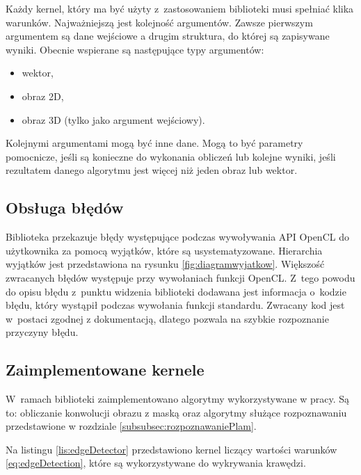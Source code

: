 Każdy kernel, który ma być użyty z~zastosowaniem biblioteki musi spełniać klika warunków. Najważniejszą jest kolejność argumentów. Zawsze pierwszym argumentem są dane wejściowe a drugim struktura, do której są zapisywane wyniki. Obecnie wspierane są następujące typy argumentów:
\begin{itemize}
\item wektor,
\item obraz 2D,
\item obraz 3D (tylko jako argument wejściowy).
\end{itemize}
Kolejnymi argumentami mogą być inne dane. Mogą to być parametry pomocnicze, jeśli są konieczne do wykonania obliczeń lub kolejne wyniki, jeśli rezultatem danego algorytmu jest więcej niż jeden obraz lub wektor.

\subsection{Obsługa błędów}
\label{subsec:obslugabledow}

Biblioteka przekazuje błędy występujące podczas wywoływania API OpenCL do użytkownika za pomocą wyjątków, które są usystematyzowane. Hierarchia wyjątków jest przedstawiona na rysunku \ref{fig:diagramwyjatkow}. Większość zwracanych błędów występuje przy wywołaniach funkcji OpenCL. Z~tego powodu do opisu błędu z~punktu widzenia biblioteki dodawana jest informacja o~kodzie błędu, który wystąpił podczas wywołania funkcji standardu. Zwracany kod jest w~postaci zgodnej z dokumentacją, dlatego pozwala na szybkie rozpoznanie przyczyny błędu.

\subsection{Zaimplementowane kernele}
\label{subsec:kernele}

W~ramach biblioteki zaimplementowano algorytmy wykorzystywane w pracy. Są to: obliczanie konwolucji obrazu z maską oraz algorytmy służące rozpoznawaniu przedstawione w rozdziale \ref{subsubsec:rozpoznawaniePlam}.

Na listingu \ref{lis:edgeDetector} przedstawiono kernel liczący wartości warunków \ref{eq:edgeDetection}, które są wykorzystywane do wykrywania krawędzi. 

